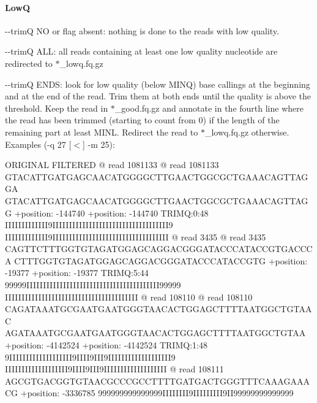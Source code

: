 \paragraph*{LowQ}


\begin{DoxyItemize}
\item {\ttfamily -\/-\/trimQ NO} or flag absent\+: nothing is done to the reads with low quality.
\item {\ttfamily -\/-\/trimQ A\+LL}\+: all reads containing at least one low quality nucleotide are redirected to {\ttfamily $\ast$\+\_\+lowq.fq.\+gz}
\item {\ttfamily -\/-\/trimQ E\+N\+DS}\+: look for low quality (below M\+I\+NQ) base callings at the beginning and at the end of the read. Trim them at both ends until the quality is above the threshold. Keep the read in {\ttfamily $\ast$\+\_\+good.fq.\+gz} and annotate in the fourth line where the read has been trimmed (starting to count from 0) if the length of the remaining part at least {\ttfamily M\+I\+NL}. Redirect the read to {\ttfamily $\ast$\+\_\+lowq.fq.\+gz} otherwise. Examples (-\/q 27 \mbox{[}$<$\mbox{]} -\/m 25)\+: 
\begin{DoxyCode}
ORIGINAL                                            FILTERED
@ read 1081133                                      @ read 1081133
GTACATTGATGAGCAACATGGGGCTTGAACTGGCGCTGAAACAGTTAGGA  GTACATTGATGAGCAACATGGGGCTTGAACTGGCGCTGAAACAGTTAGG
+position: -144740                                  +position: -144740 TRIMQ:0:48
IIIIIIIIIIIII9IIIIIIIIIIIIIIIIIIIIIIIIIIIIIIIIIII9  IIIIIIIIIIIII9IIIIIIIIIIIIIIIIIIIIIIIIIIIIIIIIIII
@ read 3435                                         @ read  3435
CAGTTCTTTGGTGTAGATGGAGCAGGACGGGATACCCATACCGTGACCCA  CTTTGGTGTAGATGGAGCAGGACGGGATACCCATACCGTG
+position: -19377                                   +position: -19377  TRIMQ:5:44
99999IIIIIIIIIIIIIIIIIIIIIIIIIIIIIIIIIIIIIIII99999  IIIIIIIIIIIIIIIIIIIIIIIIIIIIIIIIIIIIIIII
@ read 108110                                       @ read 108110
CAGATAAATGCGAATGAATGGGTAACACTGGAGCTTTTAATGGCTGTAAC  AGATAAATGCGAATGAATGGGTAACACTGGAGCTTTTAATGGCTGTAA
+position: -4142524                                 +position: -4142524  TRIMQ:1:48
9IIIIIIIIIIIIIIIIIII9IIII9III9IIIIIIIIIIIIIIIIIII9  IIIIIIIIIIIIIIIIIII9IIII9III9IIIIIIIIIIIIIIIIIII
@ read 108111
AGCGTGACGGTGTAACGCCCGCCTTTTGATGACTGGGTTTCAAAGAAACG
+position: -3336785
999999999999999IIIIIIII9IIIIIIIII9II99999999999999
\end{DoxyCode}


\end{DoxyItemize}
